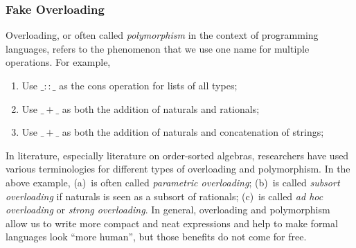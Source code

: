 \documentclass[UTF8,11pt]{article}
\theoremstyle{plain}
\theoremstyle{definition}
\theoremstyle{remark}
\newcommand{\doublecolon}{::}
\begin{document}
\subsubsection{Fake Overloading}
Overloading, or often called \emph{polymorphism} in the context of 
programming languages, refers to the 
phenomenon that we use one name for multiple operations.
For example,
\begin{enumerate}[label=(\alph*).]
	\item Use $\_\doublecolon\_$ as the cons operation for lists of all types;
	\item Use $\_+\_$ as both the addition of naturals and rationals;
	\item Use $\_+\_$ as both the addition of naturals and concatenation of 
	strings;
\end{enumerate}
In literature, especially literature on order-sorted algebras, researchers have 
used various terminologies for different types of overloading and polymorphism.
In the above example, (a)~is often called \emph{parametric 
overloading}; (b)~is called \emph{subsort overloading} if naturals is seen 
as a subsort of rationals; (c)~is called \emph{ad hoc overloading} or 
\emph{strong overloading}.
In general, overloading and polymorphism allow us to write more compact and 
neat 
expressions and help to make formal languages look ``more human'', but those 
benefits do not come for free.
\end{document}
